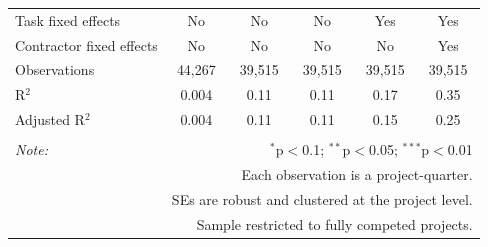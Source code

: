 \documentclass[
]{article}
\begin{document}
\begin{table}[H]
\begin{tabular}{@{\extracolsep{-2pt}}lccccc}
Task fixed effects & No & No & No & Yes & Yes \\ 
Contractor fixed effects & No & No & No & No & Yes \\ 
Observations & 44,267 & 39,515 & 39,515 & 39,515 & 39,515 \\ 
R$^{2}$ & 0.004 & 0.11 & 0.11 & 0.17 & 0.35 \\ 
Adjusted R$^{2}$ & 0.004 & 0.11 & 0.11 & 0.15 & 0.25 \\ 
\hline 
\hline \\[-1.8ex] 
\textit{Note:}  & \multicolumn{5}{r}{$^{*}$p$<$0.1; $^{**}$p$<$0.05; $^{***}$p$<$0.01} \\ 
 & \multicolumn{5}{r}{Each observation is a project-quarter.} \\ 
 & \multicolumn{5}{r}{SEs are robust and clustered at the project level.} \\ 
 & \multicolumn{5}{r}{Sample restricted to fully competed projects.} \\ 
\end{tabular} 
\end{table}
\end{document}

